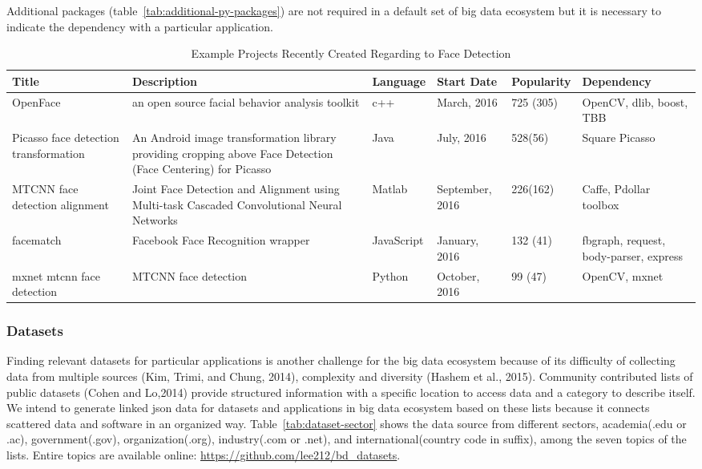 \documentclass[9pt,twocolumn,twoside]{styles/osajnl}
\begin{document}
Additional packages (table~\ref{tab:additional-py-packages}) are not required
in a default set of big data ecosystem but it is necessary to indicate the
dependency with a particular application. 

\begin{table}[htb]
  \begin{center}
    \begin{small}
      \caption{Example Projects Recently Created Regarding to Face Detection}
      \label{tab:project-examples-face}
      \begin{tabular}{p{2cm}|p{5cm}|l|l|l|p{3cm}}

    Title & Description & Language & Start Date & Popularity & Dependency \\ \hline  \hline
    OpenFace &  an open source facial behavior analysis toolkit & c++ & March, 2016 & 725 (305) & OpenCV, dlib, boost, TBB \\ \hline
    Picasso face detection transformation & An Android image transformation library providing cropping above Face Detection (Face Centering) for Picasso & Java & July, 2016 & 528(56) & Square Picasso \\ \hline
    MTCNN face detection alignment & Joint Face Detection and Alignment using Multi-task Cascaded Convolutional Neural Networks & Matlab & September, 2016 & 226(162)  &  Caffe, Pdollar toolbox \\ \hline
    facematch & Facebook Face Recognition wrapper & JavaScript & January, 2016 & 132 (41) & fbgraph, request, body-parser, express \\ \hline
    mxnet mtcnn face detection & MTCNN face detection & Python  & October, 2016 & 99 (47) & OpenCV, mxnet \\ 


  \end{tabular}
\end{small}
  \end{center}
\end{table}


\subsubsection{Datasets}

Finding relevant datasets for particular applications is another challenge for
the big data ecosystem because of its difficulty of collecting data from
multiple sources (Kim, Trimi, and Chung, 2014), complexity and diversity
(Hashem et al., 2015). Community contributed lists of public datasets (Cohen
and Lo,2014) provide structured information with a specific location to access
data and a category to describe itself. We intend to generate linked json data
for datasets and applications in big data ecosystem based on these lists
because it connects scattered data and software in an organized way.
Table~\ref{tab:dataset-sector} shows the data source from different sectors,
academia(.edu or .ac), government(.gov), organization(.org), industry(.com or
.net), and international(country code in suffix), among the seven topics of the
lists. Entire topics are available online:
\url{https://github.com/lee212/bd_datasets}.
\end{document}
